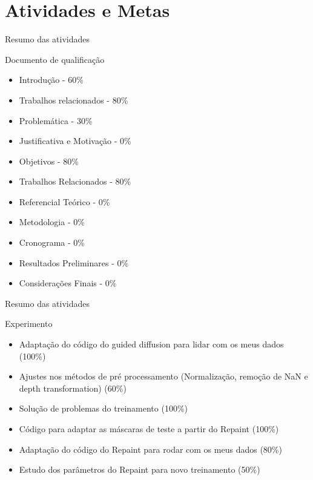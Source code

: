\documentclass[aspectratio=169]{beamer}
\begin{document}
\section{Atividades e Metas}

\begin{frame}{Resumo das atividades}

    \begin{block} {Documento de qualificação}

        \begin{itemize}
            \item Introdução - 60\%
            \item Trabalhos relacionados - 80\%
            \item Problemática - 30\%
            \item Justificativa e Motivação - 0\%
            \item Objetivos - 80\%
            \item Trabalhos Relacionados - 80\%
            \item Referencial Teórico - 0\%
            \item Metodologia - 0\%
            \item Cronograma - 0\%
            \item Resultados Preliminares - 0\% 
            \item Considerações Finais - 0\%
        \end{itemize}
        
    \end{block}
\end{frame}


\begin{frame}{Resumo das atividades}

    \begin{block} {Experimento}

        \begin{itemize}
            \item Adaptação do código do guided diffusion para lidar com os meus dados (100\%)
            \item Ajustes nos métodos de pré processamento (Normalização, remoção de NaN e depth transformation) (60\%)
            \item Solução de problemas do treinamento (100\%)
            \item Código para adaptar as máscaras de teste a partir do Repaint (100\%)
            \item Adaptação do código do Repaint para rodar com os meus dados (80\%)
            \item Estudo dos parâmetros do Repaint para novo treinamento (50\%)
        \end{itemize}
        
    \end{block}
\end{frame}
\end{document}
